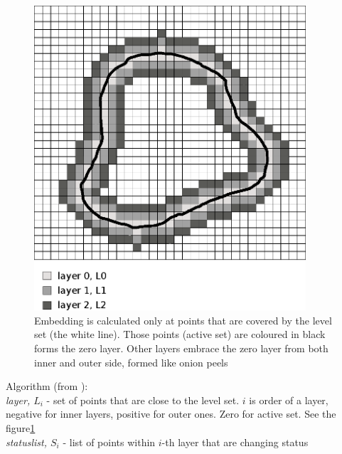 \begin{figure}
    \centering
    \includegraphics[width=0.9\textwidth]{data/sparsefield}
    \caption[Sparse fields method computation illustration]{Embedding is calculated only at points that are covered by the level set (the white line). Those points (active set) are coloured in black forms the zero layer. Other layers embrace the zero layer from both inner and outer side, formed like onion peels}
    \label{fg:sparseFilelds}
\end{figure}

\par
Algorithm (from \cite{insightIntoImages}):\\
\label{alg:sparseFileld}
\emph{layer, $L_i$} - set of points that are close to the level set. $i$ is order of a layer, negative for inner layers, positive for outer ones. Zero for active set. See the figure\ref{fg:sparseFilelds}\\
\emph{statuslist, $S_{i}$} - list of points within $i$-th layer that are changing status

